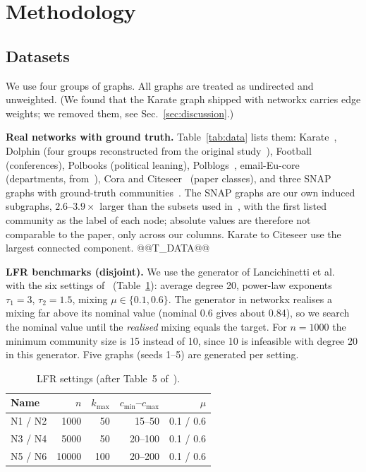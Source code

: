 \documentclass[conference]{IEEEtran}
\begin{document}
\section{Methodology}\label{sec:method}
\subsection{Datasets}\label{sec:data}
We use four groups of graphs. All graphs are treated as undirected and unweighted. (We found that the Karate graph shipped with networkx carries edge weights; we removed them, see Sec.~\ref{sec:discussion}.)

\textbf{Real networks with ground truth.} Table~\ref{tab:data} lists them: Karate~\cite{zachary1977}, Dolphin (four groups reconstructed from the original study~\cite{lusseau2003}), Football~\cite{girvan2002} (conferences), Polbooks (political leaning), Polblogs~\cite{adamic2005}, email-Eu-core (departments, from~\cite{yin2017}), Cora and Citeseer~\cite{sen2008} (paper classes), and three SNAP graphs with ground-truth communities~\cite{yang2012}. The SNAP graphs are our own induced subgraphs, $2.6$--$3.9\times$ larger than the subsets used in~\cite{kong2026}, with the first listed community as the label of each node; absolute values are therefore not comparable to the paper, only across our columns. Karate to Citeseer use the largest connected component.
@@T_DATA@@

\textbf{LFR benchmarks (disjoint).} We use the generator of Lancichinetti et al.~\cite{lfr2008} with the six settings of~\cite{kong2026} (Table~\ref{tab:lfrparam}): average degree 20, power-law exponents $\tau_1=3$, $\tau_2=1.5$, mixing $\mu\in\{0.1,0.6\}$. The generator in networkx realises a mixing far above its nominal value (nominal 0.6 gives about 0.84), so we search the nominal value until the \emph{realised} mixing equals the target. For $n=1000$ the minimum community size is 15 instead of 10, since 10 is infeasible with degree 20 in this generator. Five graphs (seeds 1--5) are generated per setting.
\begin{table}[H]
\centering
\caption{LFR settings (after Table~5 of~\cite{kong2026}).}
\label{tab:lfrparam}
\scriptsize
\begin{tabular}{lrrrr}
\toprule
Name & $n$ & $k_{\max}$ & $c_{\min}$--$c_{\max}$ & $\mu$ \\
\midrule
N1 / N2 & 1000 & 50 & 15--50 & 0.1 / 0.6 \\
N3 / N4 & 5000 & 50 & 20--100 & 0.1 / 0.6 \\
N5 / N6 & 10000 & 100 & 20--200 & 0.1 / 0.6 \\
\bottomrule
\end{tabular}
\end{table}
\end{document}

